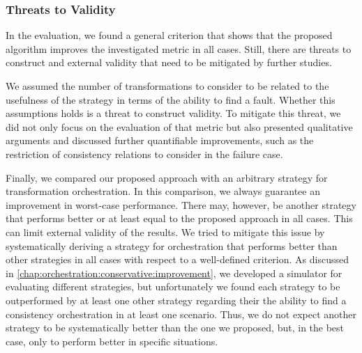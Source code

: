 



\subsubsection{Threats to Validity}

In the evaluation, we found a general criterion that shows that the proposed algorithm improves the investigated metric in all cases.
Still, there are threats to construct and external validity that need to be mitigated by further studies.

We assumed the number of transformations to consider to be related to the usefulness of the strategy in terms of the ability to find a fault.
Whether this assumptions holds is a threat to construct validity.
To mitigate this threat, we did not only focus on the evaluation of that metric but also presented qualitative arguments and discussed further quantifiable improvements, such as the restriction of consistency relations to consider in the failure case.

Finally, we compared our proposed approach with an arbitrary strategy for transformation orchestration.
In this comparison, we always guarantee an improvement in worst-case performance.
There may, however, be another strategy that performs better or at least equal to the proposed approach in all cases.
This can limit external validity of the results.
We tried to mitigate this issue by systematically deriving a strategy for orchestration that performs better than other strategies in all cases with respect to a well-defined criterion.
As discussed in \autoref{chap:orchestration:conservative:improvement}, we developed a simulator for evaluating different strategies, but unfortunately we found each strategy to be outperformed by at least one other strategy regarding their the ability to find a consistency orchestration in at least one scenario.
Thus, we do not expect another strategy to be systematically better than the one we proposed, but, in the best case, only to perform better in specific situations.


